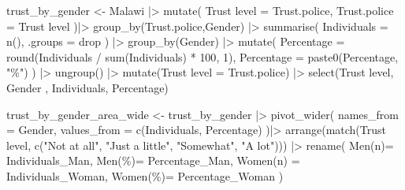 \documentclass[
  letterpaper,
  DIV=11,
  numbers=noendperiod]{scrartcl}
\newenvironment{Shaded}{\begin{snugshade}}{\end{snugshade}}
\newcommand{\AttributeTok}[1]{\textcolor[rgb]{0.40,0.45,0.13}{#1}}
\newcommand{\DecValTok}[1]{\textcolor[rgb]{0.68,0.00,0.00}{#1}}
\newcommand{\FunctionTok}[1]{\textcolor[rgb]{0.28,0.35,0.67}{#1}}
\newcommand{\NormalTok}[1]{\textcolor[rgb]{0.00,0.23,0.31}{#1}}
\newcommand{\OtherTok}[1]{\textcolor[rgb]{0.00,0.23,0.31}{#1}}
\newcommand{\SpecialCharTok}[1]{\textcolor[rgb]{0.37,0.37,0.37}{#1}}
\newcommand{\StringTok}[1]{\textcolor[rgb]{0.13,0.47,0.30}{#1}}
\begin{document}
\begin{Shaded}
\begin{Highlighting}[]
\NormalTok{trust\_by\_gender }\OtherTok{\textless{}{-}}\NormalTok{ Malawi }\SpecialCharTok{|\textgreater{}}
  \FunctionTok{mutate}\NormalTok{( }\StringTok{\textasciigrave{}}\AttributeTok{Trust level}\StringTok{\textasciigrave{}} \OtherTok{=}\NormalTok{ Trust.police,}
          \AttributeTok{Trust.police =} \StringTok{\textasciigrave{}}\AttributeTok{Trust level}\StringTok{\textasciigrave{}}\NormalTok{ )}\SpecialCharTok{|\textgreater{}}
  \FunctionTok{group\_by}\NormalTok{(Trust.police,Gender) }\SpecialCharTok{|\textgreater{}}
  \FunctionTok{summarise}\NormalTok{(}
    \AttributeTok{Individuals =} \FunctionTok{n}\NormalTok{(), }\AttributeTok{.groups =} \StringTok{\textquotesingle{}drop\textquotesingle{}}
\NormalTok{    ) }\SpecialCharTok{|\textgreater{}}
  \FunctionTok{group\_by}\NormalTok{(Gender) }\SpecialCharTok{|\textgreater{}}
  \FunctionTok{mutate}\NormalTok{(}
\AttributeTok{Percentage =} \FunctionTok{round}\NormalTok{(Individuals }\SpecialCharTok{/} \FunctionTok{sum}\NormalTok{(Individuals) }\SpecialCharTok{*} \DecValTok{100}\NormalTok{, }\DecValTok{1}\NormalTok{),}
    \AttributeTok{Percentage =} \FunctionTok{paste0}\NormalTok{(Percentage, }\StringTok{"\%"}\NormalTok{)}
\NormalTok{  ) }\SpecialCharTok{|\textgreater{}}
  \FunctionTok{ungroup}\NormalTok{() }\SpecialCharTok{|\textgreater{}}
  \FunctionTok{mutate}\NormalTok{(}\StringTok{\textasciigrave{}}\AttributeTok{Trust level}\StringTok{\textasciigrave{}} \OtherTok{=}\NormalTok{ Trust.police) }\SpecialCharTok{|\textgreater{}}
  \FunctionTok{select}\NormalTok{(}\StringTok{\textasciigrave{}}\AttributeTok{Trust level}\StringTok{\textasciigrave{}}\NormalTok{, Gender , Individuals, Percentage)}

\NormalTok{trust\_by\_gender\_area\_wide }\OtherTok{\textless{}{-}}\NormalTok{ trust\_by\_gender }\SpecialCharTok{|\textgreater{}}
  \FunctionTok{pivot\_wider}\NormalTok{(}
    \AttributeTok{names\_from  =}\NormalTok{ Gender,}
    \AttributeTok{values\_from =} \FunctionTok{c}\NormalTok{(Individuals, Percentage)}
\NormalTok{    )}\SpecialCharTok{|\textgreater{}}
\FunctionTok{arrange}\NormalTok{(}\FunctionTok{match}\NormalTok{(}\StringTok{\textasciigrave{}}\AttributeTok{Trust level}\StringTok{\textasciigrave{}}\NormalTok{,}
                \FunctionTok{c}\NormalTok{(}\StringTok{"Not at all"}\NormalTok{, }\StringTok{"Just a little"}\NormalTok{, }\StringTok{"Somewhat"}\NormalTok{, }\StringTok{"A lot"}\NormalTok{))) }\SpecialCharTok{|\textgreater{}}
\FunctionTok{rename}\NormalTok{(}
    \StringTok{\textasciigrave{}}\AttributeTok{Men(n)}\StringTok{\textasciigrave{}}\OtherTok{=}\NormalTok{ Individuals\_Man,}
    \StringTok{\textasciigrave{}}\AttributeTok{Men(\%)}\StringTok{\textasciigrave{}}\OtherTok{=}\NormalTok{ Percentage\_Man,}
    \StringTok{\textasciigrave{}}\AttributeTok{Women(n)}\StringTok{\textasciigrave{}} \OtherTok{=}\NormalTok{ Individuals\_Woman,}
    \StringTok{\textasciigrave{}}\AttributeTok{Women(\%)}\StringTok{\textasciigrave{}}\OtherTok{=}\NormalTok{ Percentage\_Woman}
\NormalTok{  )}


\end{Highlighting}
\end{Shaded}
\end{document}
